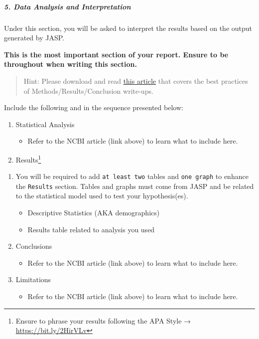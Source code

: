 \documentclass[11pt,]{article}
\providecommand{\tightlist}{%
  \setlength{\itemsep}{0pt}\setlength{\parskip}{0pt}}
\begin{document}
\hypertarget{data-analysis-and-interpretation}{%
\subparagraph{5. Data Analysis and
Interpretation}\label{data-analysis-and-interpretation}}

Under this section, you will be asked to interpret the results based on
the output generated by JASP.

\textbf{This is the most important section of your report. Ensure to be
throughout when writing this section.}

\begin{quote}
Hint: Please download and read
\href{https://www.ncbi.nlm.nih.gov/pmc/articles/PMC4062332/pdf/biochem-med-22-1-15-3.pdf}{this
article} that covers the best practices of Methods/Results/Conclusion
write-ups.
\end{quote}

Include the following and in the sequence presented below:

\begin{enumerate}
\def\labelenumi{\arabic{enumi}.}
\item
  Statistical Analysis

  \begin{itemize}
  \tightlist
  \item
    Refer to the NCBI article (link above) to learn what to include
    here.
  \end{itemize}
\item
  Results\footnote{Ensure to phrase your results following the APA Style
    → \url{https://bit.ly/2HirVLv}}
\end{enumerate}

\begin{enumerate}
\def\labelenumi{\alph{enumi}.}
\item
  You will be required to add \texttt{at\ least\ two} tables and
  \texttt{one\ graph} to enhance the \texttt{Results} section. Tables
  and graphs must come from JASP and be related to the statistical model
  used to test your hypothesis(es).

  \begin{itemize}
  \item
    Descriptive Statistics (AKA demographics)
  \item
    Results table related to analysis you used
  \end{itemize}
\item
  Conclusions

  \begin{itemize}
  \tightlist
  \item
    Refer to the NCBI article (link above) to learn what to include
    here.
  \end{itemize}
\item
  Limitations

  \begin{itemize}
  \tightlist
  \item
    Refer to the NCBI article (link above) to learn what to include
    here.
  \end{itemize}
\end{enumerate}
\end{document}
